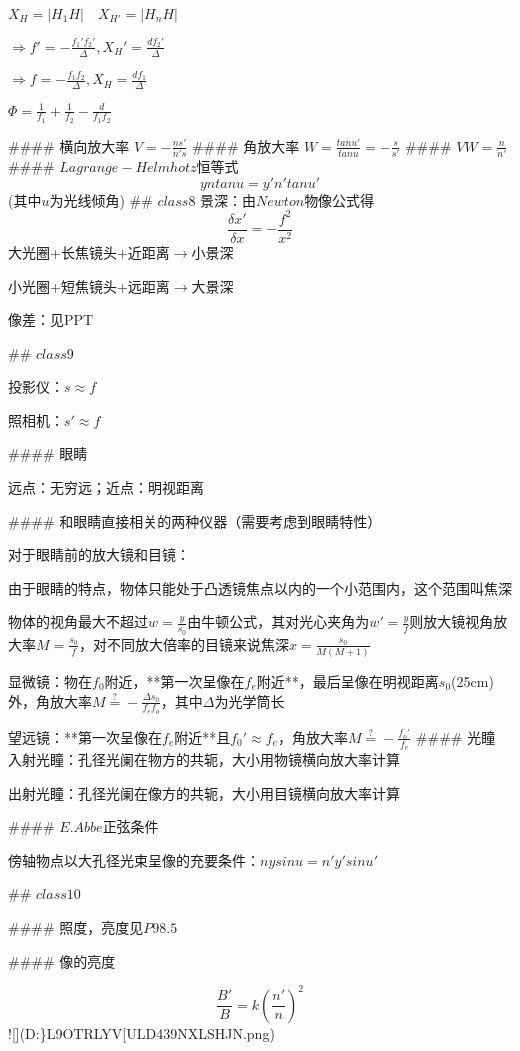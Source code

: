 \documentclass[12pt]{ctexart}
\begin{document}
$X_{H}=|H_1H|\quad X_{H'}=|H_nH|$

$\Rightarrow f'=-\frac{f_1'f_2'}{\Delta},X_H'=\frac{df_2'}{\Delta}$

$\Rightarrow f=-\frac{f_1f_2}{\Delta},X_H=\frac{df_1}{\Delta}$

$\Phi=\frac{1}{f_1}+\frac{1}{f_2}-\frac{d}{f_1f_2}$

#### 横向放大率
$V=-\frac{ns'}{n's}$
#### 角放大率
$W=\frac{tanu'}{tanu}=-\frac{s}{s'}$
#### $VW=\frac{n}{n'}$
#### $Lagrange-Helmhotz$恒等式
$$yntanu=y'n'tanu'$$
(其中$u$为光线倾角)
## $class8$
景深：由$Newton$物像公式得
$$\frac{\delta x'}{\delta x}=-\frac{f^2}{x^2}$$
大光圈+长焦镜头+近距离$\rightarrow$小景深

小光圈+短焦镜头+远距离$\rightarrow$大景深

像差：见PPT

## $class9$

投影仪：$s\approx f$

照相机：$s'\approx f$

#### 眼睛

远点：无穷远；近点：明视距离

#### 和眼睛直接相关的两种仪器（需要考虑到眼睛特性）

对于眼睛前的放大镜和目镜：

由于眼睛的特点，物体只能处于凸透镜焦点以内的一个小范围内，这个范围叫焦深

物体的视角最大不超过$w=\frac{y}{s_0}$由牛顿公式，其对光心夹角为$w'=\frac{y}{f}$则放大镜视角放大率$M=\frac{s_0}{f}$，对不同放大倍率的目镜来说焦深$x=\frac{s_0}{M(M+1)}$

显微镜：物在$f_0$附近，**第一次呈像在$f_e$附近**，最后呈像在明视距离$s_0$(25cm)外，角放大率$M\stackrel{?}{=}-\frac{\Delta s_0}{f_ef_o}$，其中$\Delta$为光学筒长

望远镜：**第一次呈像在$f_e$附近**且$f_0'\approx f_e$，角放大率$M\stackrel{?}{=}-\frac{f_o'}{f_e}$
#### 光瞳
入射光瞳：孔径光阑在物方的共轭，大小用物镜横向放大率计算

出射光瞳：孔径光阑在像方的共轭，大小用目镜横向放大率计算

#### $E.Abbe$正弦条件

傍轴物点以大孔径光束呈像的充要条件：$nysinu=n'y'sinu'$

## $class10$

#### 照度，亮度见$P98.5$

#### 像的亮度

$$\frac{B'}{B}=k(\frac{n'}{n})^2$$
![](D:\markdown\}L9OTRLYV[ULD439NXLSHJN.png)
\end{document}
